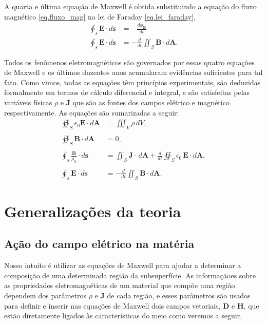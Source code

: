 A quarta e última equação de Maxwell é obtida substituindo a equação do fluxo magnético \ref{eq.fluxo_mag} na lei de Faraday \ref{eq.lei_faraday},
\begin{align*}
\oint_s\mathbf{E}\cdot d\mathbf{s}&=-\frac{d\phi_\mathbf{B}}{dt}\\
\oint_s\mathbf{E}\cdot d\mathbf{s}&=-\frac{d}{dt}\iint_S\mathbf{B}\cdot d\mathbf{A}.
\end{align*}

Todos os fenômenos eletromagnéticos são governados por essas quatro equações de Maxwell  e os últimos duzentos anos acumularam evidências suficientes para tal fato. Como vimos, todas as equações têm princípios experimentais, são deduzidas formalmente em termos de cálculo diferencial e integral, e são satisfeitas pelas variáveis físicas $\rho$ e $\mathbf{J}$ que são as fontes dos campos elétrico e magnético respectivamente. As equações são sumarizadas a seguir:
\begin{align}\label{eq.maxwell_1}
\oiint_S\epsilon_0\textbf{E}\cdot\textit{d}\textbf{A}&=\iiint_{V}\rho\,dV,\\\nonumber\\\label{eq.maxwell_2}
\oiint_S\textbf{B}\cdot\textit{d}\textbf{A}&=0,\\\nonumber\\\label{eq.maxwell_3}
\oint_s\frac{\mathbf{B}}{\mu_0}\cdot d\mathbf{s}&=\iint_S\mathbf{J}\cdot\,d\mathbf{A}+\frac{d}{dt}\oiint_S\epsilon_0\,\textbf{E}\cdot\textit{d}\textbf{A},\\\nonumber\\\label{eq.maxwell_4}
\oint_s\mathbf{E}\cdot d\mathbf{s}&=-\frac{d}{dt}\iint_S\mathbf{B}\cdot d\mathbf{A}.
\end{align}

\section{Generalizações da teoria}

\subsection{Ação do campo elétrico na matéria}

Nosso intuito é utilizar as equações de Maxwell para ajudar a determinar a composição de uma determinada região da subsuperfície. As informaçãoes sobre as propriedades eletromagnéticas de um material que compõe uma região dependem dos parâmetros $\rho$ e $\mathbf{J}$ de cada região, e esses parâmetros são usados para definir e inserir nas equações de Maxwell dois campos vetoriais, $\mathbf{D}$ e $\mathbf{H}$, que estão diretamente ligados às características do meio como veremos a seguir.

